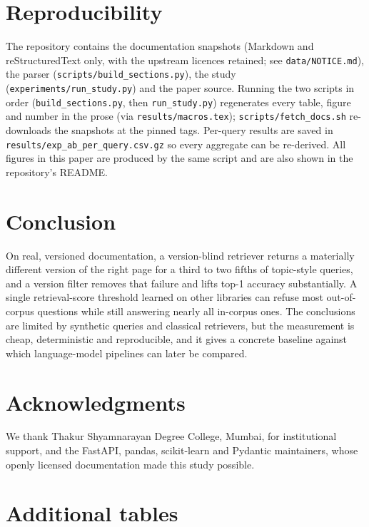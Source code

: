 \documentclass[11pt,a4paper]{article}
\begin{document}
\section{Reproducibility}
The repository contains the documentation snapshots (Markdown and reStructuredText only, with the upstream licences retained; see \texttt{data/NOTICE.md}), the parser (\texttt{scripts/}\allowbreak\texttt{build\_sections.py}),
the study (\texttt{experiments/}\allowbreak\texttt{run\_study.py}) and the paper source. Running the two scripts in order (\texttt{build\_sections.py}, then \texttt{run\_study.py}) regenerates every table, figure and number in the prose (via \texttt{results/macros.tex});
\texttt{scripts/fetch\_docs.sh} re-downloads the snapshots at the pinned tags. Per-query results are saved in \texttt{results/}\allowbreak\texttt{exp\_ab\_per\_query.csv.gz} so every aggregate can be re-derived. All figures in this paper are produced by the same script and are also shown in the repository's README.

\section{Conclusion}
On real, versioned documentation, a version-blind retriever returns a materially different version of the right page for a third to two fifths of topic-style queries, and a version filter removes that failure and lifts top-1 accuracy substantially. A single retrieval-score threshold
learned on other libraries can refuse most out-of-corpus questions while still answering nearly all in-corpus ones. The conclusions are limited by synthetic queries and classical retrievers, but the measurement is cheap, deterministic and reproducible, and it gives a concrete baseline against which language-model pipelines can later be compared.

\section*{Acknowledgments}
We thank Thakur Shyamnarayan Degree College, Mumbai, for institutional support, and the FastAPI, pandas, scikit-learn and Pydantic maintainers, whose openly licensed documentation made this study possible.




\appendix
\section{Additional tables}
\begin{table}[htbp]\centering\footnotesize
\caption{Unchanged sections, heading queries: harmless version confusion (\%, mean and 95\% CI). Strict Hit@1 counts only the exact section; Equivalent Hit@1 also accepts the content-identical other version.}\label{tab:unch}

\end{table}
\end{document}
